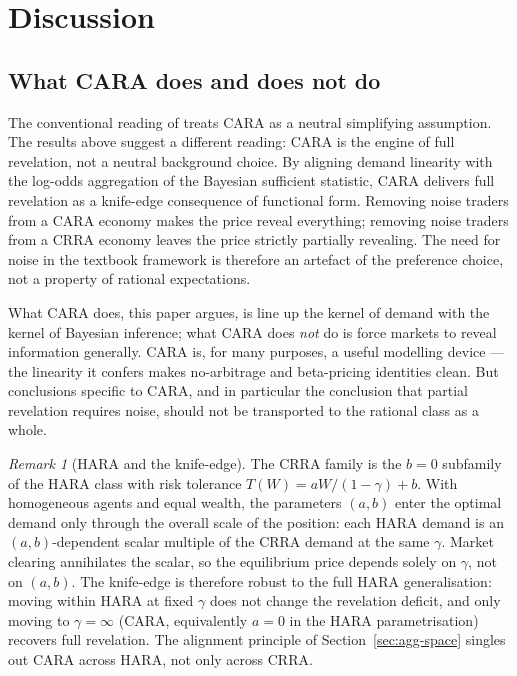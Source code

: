 \documentclass[12pt,letterpaper]{article}
\theoremstyle{definition}
\theoremstyle{remark}
\newtheorem{remark}{Remark}
\newcommand{\1}{\mathbf{1}}
\begin{document}
\section{Discussion}\label{sec:discussion}

\subsection{What CARA does and does not do}

The conventional reading of \citet{GrossmanStiglitz1980} treats CARA as a
neutral simplifying assumption. The results above suggest a different
reading: CARA is the engine of full revelation, not a neutral background
choice. By aligning demand linearity with the log-odds aggregation of the
Bayesian sufficient statistic, CARA delivers full revelation as a
knife-edge consequence of functional form. Removing noise traders from a
CARA economy makes the price reveal everything; removing noise traders
from a CRRA economy leaves the price strictly partially revealing. The
need for noise in the textbook framework is therefore an artefact of the
preference choice, not a property of rational expectations.

What CARA does, this paper argues, is line up the kernel of demand with
the kernel of Bayesian inference; what CARA does \emph{not} do is force
markets to reveal information generally. CARA is, for many purposes, a
useful modelling device --- the linearity it confers makes
no-arbitrage and beta-pricing identities clean. But conclusions specific
to CARA, and in particular the conclusion that partial revelation
requires noise, should not be transported to the rational class as a
whole.

\begin{remark}[HARA and the knife-edge]\label{rem:hara}
The CRRA family is the $b=0$ subfamily of the HARA class with risk
tolerance $T(W)=aW/(1-\gamma)+b$. With homogeneous agents and equal
wealth, the parameters $(a,b)$ enter the optimal demand only through the
overall scale of the position: each HARA demand is an
$(a,b)$-dependent scalar multiple of the CRRA demand at the same
$\gamma$. Market clearing annihilates the scalar, so the equilibrium
price depends solely on $\gamma$, not on $(a,b)$. The knife-edge is
therefore robust to the full HARA generalisation: moving within HARA at
fixed $\gamma$ does not change the revelation deficit, and only moving
to $\gamma=\infty$ (CARA, equivalently $a=0$ in the HARA parametrisation)
recovers full revelation. The alignment principle of
Section~\ref{sec:agg-space} singles out CARA across HARA, not only
across CRRA.
\end{remark}
\end{document}
